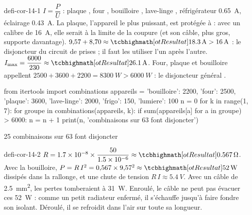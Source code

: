 \begin{blocEdition}{defi-cor-14-1}
$I=\dfrac{P}{U}$ : plaque , four , bouilloire , lave-linge , réfrigérateur \qty{0,65}{A}, éclairage
\qty{0,43}{A}. La plaque, l'appareil le plus puissant, est protégée à  : avec un calibre de \qty{16}{A}, elle serait à la limite de
la coupure (et son câble, plus gros, supporte davantage).
$9{,}57+8{,}70\approx\res{\qty{18,3}{A}}>\qty{16}{A}$ : le disjoncteur du circuit de prises  ; il faut les utiliser l'un après l'autre.
$I_\mathrm{max}=\dfrac{6000}{230}\approx\res{\qty{26,1}{A}}$. Four, plaque et bouilloire appellent $2500+3600+2200=\qty{8300}{W}>\qty{6000}{W}$ : le disjoncteur général
.
\begin{python}
from itertools import combinations
appareils = {'bouilloire': 2200, 'four': 2500, 'plaque': 3600,
             'lave-linge': 2000, 'frigo': 150, 'lumiere': 100}
n = 0
for k in range(1, 7):
    for groupe in combinations(appareils, k):
        if sum(appareils[a] for a in groupe) > 6000:
            n = n + 1
print(n, 'combinaisons sur 63 font disjoncter')
\end{python}
\begin{console}
25 combinaisons sur 63 font disjoncter
\end{console}
\end{blocEdition}

\begin{blocEdition}{defi-cor-14-2}
\label{figedition-defi-cor-14-2-1}
$R=\num{1,7e-8}\times\dfrac{50}{\num{1,5e-6}}\approx\res{\qty{0,567}{\ohm}}$. Avec la bouilloire, $P=R\,I^2=0{,}567\times9{,}57^2\approx\res{\qty{52}{W}}$ dissipés dans la rallonge, et
une chute de tension $R\,I\approx\qty{5,4}{V}$. Avec un câble de \qty{2,5}{mm^2}, les pertes tomberaient à \qty{31}{W}.
Enroulé, le câble ne peut pas évacuer ces \qty{52}{W} : comme un petit radiateur enfermé, il s'échauffe jusqu'à faire fondre son isolant.
Déroulé, il se refroidit dans l'air sur toute sa longueur.
\end{blocEdition}

